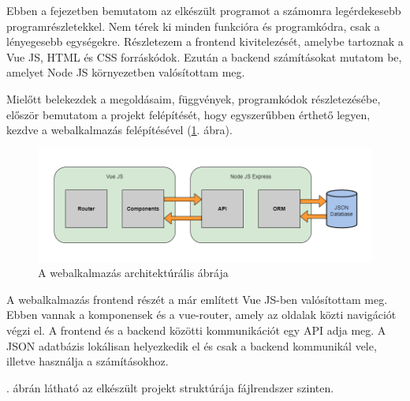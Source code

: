 
Ebben a fejezetben bemutatom az elkészült programot a számomra legérdekesebb programrészletekkel. Nem térek ki minden funkcióra és programkódra, csak a lényegesebb egységekre. Részletezem a frontend kivitelezését, amelybe tartoznak a Vue JS, HTML és CSS forráskódok. Ezután a backend számításokat mutatom be, amelyet Node JS környezetben valósítottam meg.


Mielőtt belekezdek a megoldásaim, függvények, programkódok részletezésébe, először bemutatom a projekt felépítését, hogy egyszerűbben érthető legyen, kezdve a webalkalmazás felépítésével (\ref{fig:web-arch}. ábra). 

\begin{figure}[h]
	\centering
	\includegraphics[width=\textwidth]{images/web-arch.png}
	\caption{A webalkalmazás architektúrális ábrája}
	\label{fig:web-arch}
\end{figure}

A webalkalmazás frontend részét a már említett Vue JS-ben valósítottam meg. Ebben vannak a komponensek és a vue-router, amely az oldalak közti navigációt végzi el. A frontend és a backend közötti kommunikációt egy API adja meg. A JSON adatbázis lokálisan helyezkedik el és csak a backend kommunikál vele, illetve használja a számításokhoz.

. ábrán látható az elkészült projekt struktúrája fájlrendszer szinten.

